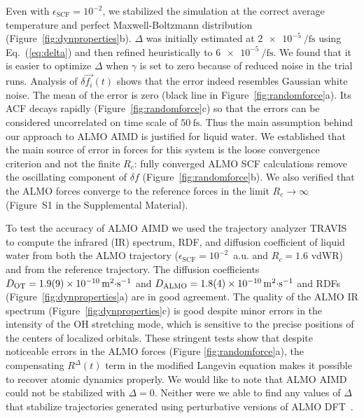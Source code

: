 \documentclass[aps,prl,reprint,amsmath,amssymb]{revtex4-1}
\begin{document}
Even with $\epsilon_{\text{SCF}} = 10^{-2}$, we stabilized the simulation at the correct average temperature and perfect Maxwell-Boltzmann distribution (Figure~\ref{fig:dynproperties}b). $\Delta$ was initially estimated at $\SI{2e-5}{\per\fs}$ using Eq.~(\ref{eq:delta}) and then refined heuristically to $\SI{6e-5}{\per\fs}$. 
We found that it is easier to optimize $\Delta$ when $\gamma$ is set to zero because of reduced noise in the trial runs. 
%
Analysis of $\delta \vec{f_{i}}(t)$ shows that the error indeed resembles Gaussian white noise. The mean of the error is zero (black line in Figure~\ref{fig:randomforce}a). Its ACF decays rapidly (Figure~\ref{fig:randomforce}c) so that the errors can be considered uncorrelated on time scale of $\SI{50}{\fs}$. Thus the main assumption behind our approach to ALMO AIMD is justified for liquid water. We established that the main source of error in forces for this system is the loose convergence criterion and not the finite $R_c$: fully converged ALMO SCF calculations remove the oscillating component of $\delta f$ (Figure~\ref{fig:randomforce}b). We also verified that the ALMO forces converge to the reference forces in the limit $R_{c} \rightarrow \infty$ 
(Figure~S1 in the Supplemental Material).



To test the accuracy of ALMO AIMD we used the trajectory analyzer TRAVIS~\cite{a:travis-main} to compute the infrared (IR) spectrum, RDF, and diffusion coefficient of liquid water from both the ALMO trajectory ($\epsilon_{\text{SCF}} = 10^{-2}$~a.u. and $R_{c} = 1.6$ vdWR) and from the reference trajectory. 
The diffusion coefficients $D_{\text{OT}}=\SI{1.9\pm0.9E-10}{\m^{2}\cdot\s^{-1}}$ and $D_{\text{ALMO}}=\SI{1.8\pm0.4E-10}{\m^{2}\cdot\s^{-1}}$ and RDFs (Figure~\ref{fig:dynproperties}a) are in good agreement. The quality of the ALMO IR spectrum (Figure~\ref{fig:dynproperties}c) is good despite minor errors in the intensity of the OH stretching mode, which is sensitive to the precise positions of the centers of localized orbitals. These stringent tests show that despite noticeable errors in the ALMO forces (Figure \ref{fig:randomforce}a), the compensating $R^{\Delta}(t)$ term in the modified Langevin equation makes it possible to recover atomic dynamics properly. We would like to note that ALMO AIMD could not be stabilized with $\Delta=0$. Neither were we able to find any values of $\Delta$ that stabilize trajectories generated using perturbative versions of ALMO DFT~\cite{a:almo-ls}.
\end{document}
